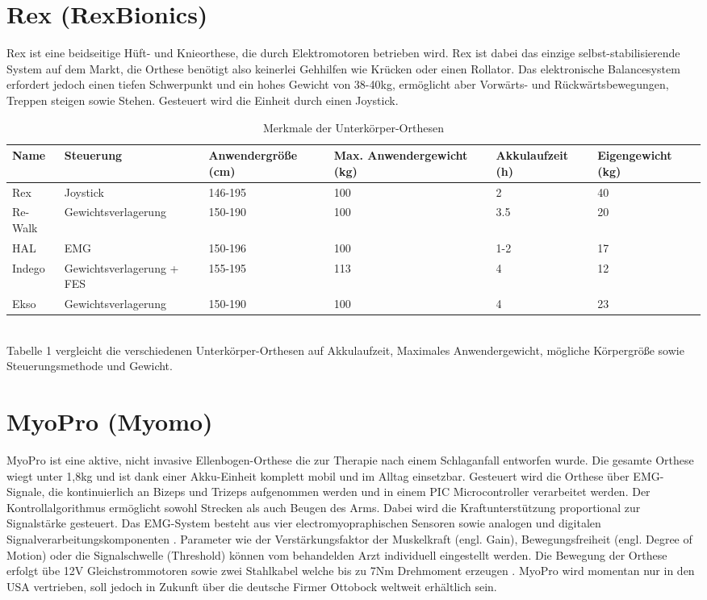 \section{Rex (RexBionics)}     
Rex ist eine beidseitige Hüft- und Knieorthese, die durch Elektromotoren betrieben wird. Rex ist dabei das einzige selbst-stabilisierende System auf dem Markt, die Orthese benötigt also keinerlei Gehhilfen wie Krücken oder einen Rollator\citep{Aach.2015,Lajeunesse.2016}. Das elektronische Balancesystem erfordert jedoch einen tiefen Schwerpunkt und ein hohes Gewicht von 38-40kg, ermöglicht aber Vorwärts- und Rückwärtsbewegungen, Treppen steigen sowie Stehen. Gesteuert wird die Einheit durch einen Joystick\citep{Barbareschi.2015}. 
\\
\begin{table}%
\begin{tabular}{p{2.5cm}|p{3.5cm}|p{2.5cm}|p{2.5cm}|p{1.8cm}|p{1.5cm}}
Name & Steuerung & Anwendergröße (cm) & Max. Anwendergewicht (kg) & Akkulaufzeit (h) & Eigengewicht (kg) \\
\hline
Rex & Joystick & 146-195 & 100 & 2 & 40 \\
Re-Walk & Gewichtsverlagerung & 150-190 & 100 & 3.5 & 20 \\
HAL & EMG & 150-196 & 100 & 1-2 & 17 \\
Indego & Gewichtsverlagerung + FES & 155-195 & 113 & 4 & 12 \\
Ekso & Gewichtsverlagerung & 150-190 & 100 & 4 & 23 \\

\end{tabular}
\caption{Merkmale der Unterkörper-Orthesen}
\label{Tabelle 1}
\end{table}
\\
Tabelle 1 vergleicht die verschiedenen Unterkörper-Orthesen auf Akkulaufzeit, Maximales Anwendergewicht, mögliche Körpergröße sowie Steuerungsmethode und Gewicht.

\section{MyoPro (Myomo)}
MyoPro ist eine aktive, nicht invasive Ellenbogen-Orthese die zur Therapie nach einem Schlaganfall entworfen wurde. Die gesamte Orthese wiegt unter 1,8kg und ist dank einer Akku-Einheit komplett mobil und im Alltag einsetzbar. Gesteuert wird die Orthese über EMG-Signale, die kontinuierlich an Bizeps und Trizeps aufgenommen werden und in einem PIC Microcontroller verarbeitet werden. Der Kontrollalgorithmus ermöglicht sowohl Strecken als auch Beugen des Arms. Dabei wird die Kraftunterstützung proportional zur Signalstärke gesteuert. Das EMG-System besteht aus vier electromyopraphischen Sensoren sowie analogen und digitalen Signalverarbeitungskomponenten \citep{Peters.2017}. Parameter wie der Verstärkungsfaktor der Muskelkraft (engl. Gain), Bewegungsfreiheit (engl. Degree of Motion) oder die Signalschwelle (Threshold) können vom behandelden Arzt individuell eingestellt werden. Die Bewegung der Orthese erfolgt übe 12V Gleichstrommotoren sowie zwei Stahlkabel welche bis zu 7Nm Drehmoment erzeugen \citep{Stein.2007}. MyoPro wird momentan nur in den USA vertrieben, soll jedoch in Zukunft über die deutsche Firmer Ottobock weltweit erhältlich sein.
